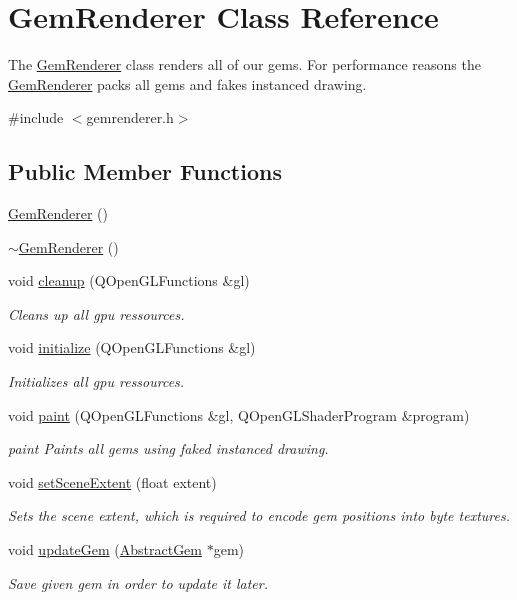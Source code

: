 \hypertarget{class_gem_renderer}{\section{Gem\+Renderer Class Reference}
\label{class_gem_renderer}
}


The \hyperlink{class_gem_renderer}{Gem\+Renderer} class renders all of our gems.  For performance reasons the \hyperlink{class_gem_renderer}{Gem\+Renderer} packs all gems and fakes instanced drawing.  




{\ttfamily \#include $<$gemrenderer.\+h$>$}

\subsection*{Public Member Functions}
\begin{DoxyCompactItemize}
\item 
\hyperlink{class_gem_renderer_ab7d20a029bd5b43a1a6f9ed660cfebd8}{Gem\+Renderer} ()
\item 
\hyperlink{class_gem_renderer_af66cf5ad414c21487c8513a8e5bf972a}{$\sim$\+Gem\+Renderer} ()
\item 
void \hyperlink{class_gem_renderer_a9da8103dc08a4203727b6967337fa65b}{cleanup} (Q\+Open\+G\+L\+Functions \&gl)
\begin{DoxyCompactList}\small\item\em Cleans up all gpu ressources. \end{DoxyCompactList}\item 
void \hyperlink{class_gem_renderer_a2d4dc2d6f9b1aae7dc1e8b8d09b153de}{initialize} (Q\+Open\+G\+L\+Functions \&gl)
\begin{DoxyCompactList}\small\item\em Initializes all gpu ressources. \end{DoxyCompactList}\item 
void \hyperlink{class_gem_renderer_a0a1765f07c953c05b1d7865f356b7ba2}{paint} (Q\+Open\+G\+L\+Functions \&gl, Q\+Open\+G\+L\+Shader\+Program \&program)
\begin{DoxyCompactList}\small\item\em paint Paints all gems using faked instanced drawing. \end{DoxyCompactList}\item 
void \hyperlink{class_gem_renderer_afdc5555e3e82c4a021deac461fffe435}{set\+Scene\+Extent} (float extent)
\begin{DoxyCompactList}\small\item\em Sets the scene extent, which is required to encode gem positions into byte textures. \end{DoxyCompactList}\item 
void \hyperlink{class_gem_renderer_a4be8d2a7b1443262392adc828f3910c8}{update\+Gem} (\hyperlink{class_abstract_gem}{Abstract\+Gem} $\ast$gem)
\begin{DoxyCompactList}\small\item\em Save given gem in order to update it later. \end{DoxyCompactList}\end{DoxyCompactItemize}
